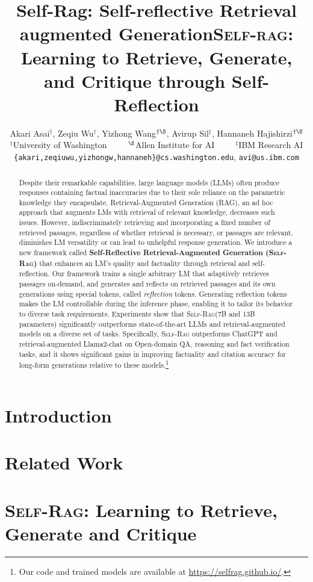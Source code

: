 \documentclass{article} %
\title{Self-Rag: Self-reflective Retrieval augmented Generation}
\title{\textsc{Self-rag:} Learning to Retrieve, Generate, and Critique through Self-Reflection}
\author{Akari Asai$^\dagger$, Zeqiu Wu$^\dagger$, Yizhong Wang$^{\dagger\S}$, Avirup Sil$^\ddagger$, Hannaneh Hajishirzi$^{\dagger\S}$ \\
$^\dagger$University of Washington~~~~~$^\S$Allen Institute for AI~~~~~$^\ddagger$IBM Research AI \\
\texttt{\{akari,zeqiuwu,yizhongw,hannaneh\}@cs.washington.edu}, \texttt{avi@us.ibm.com} \\
}
\newcommand{\model}{\textsc{Self-Rag}\xspace}
\begin{document}
\maketitle

\begin{abstract}
Despite their remarkable capabilities, large language models (LLMs) often produce responses containing factual inaccuracies due to their sole reliance on the parametric knowledge they encapsulate. 
Retrieval-Augmented Generation (RAG), an ad hoc approach that augments LMs with retrieval of relevant knowledge, decreases such issues. 
However, indiscriminately retrieving and incorporating a fixed number of retrieved passages, regardless of whether retrieval is necessary, or passages are relevant, diminishes LM versatility or can lead to unhelpful response generation.
We introduce a new framework called {\bf Self-Reflective Retrieval-Augmented Generation (\model)} that enhances an LM's quality and factuality through retrieval and self-reflection. 
Our framework trains a single arbitrary LM that adaptively retrieves passages on-demand, and generates and reflects on retrieved passages and its own generations using special tokens, called {\it reflection} tokens. Generating reflection tokens makes the LM controllable during the inference phase, enabling it to tailor its behavior to diverse task requirements. 
Experiments show that \model (7B and 13B parameters) significantly outperforms state-of-the-art LLMs and retrieval-augmented models on a diverse set of tasks. 
Specifically, \model outperforms ChatGPT and retrieval-augmented Llama2-chat on Open-domain QA, reasoning and fact verification tasks, and it shows significant gains in improving factuality and citation accuracy for long-form generations relative to these models.\footnote{{Our code and trained models are available at \url{https://selfrag.github.io/}}.}  


\end{abstract}

\section{Introduction}



\section{Related Work}


\section{\model: Learning to Retrieve, Generate and Critique}

\end{document}
